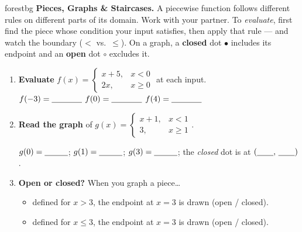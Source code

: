 \documentclass[10pt]{article}
\newcommand{\lgrid}[4]{%
  \draw[step=1, linegray!40, very thin] (#1,#3) grid (#2,#4);
  \draw[->, semithick, charcoal] (#1,0)--(#2,0) node[below right, font=\scriptsize]{$x$};
  \draw[->, semithick, charcoal] (0,#3)--(0,#4) node[left, font=\scriptsize]{$y$};}
\newcommand{\closeddot}[2]{\fill[forest] (#1,#2) circle (3.5pt);}
\newcommand{\opendot}[2]{\draw[very thick, forest, fill=white] (#1,#2) circle (3.5pt);}
\begin{document}

\vspace{0.08in}

\begin{headlinebox}{forestbg}
\small\textbf{Pieces, Graphs \& Staircases.} A piecewise function follows different rules on different
parts of its domain. Work with your partner. To \emph{evaluate}, first find the piece whose condition
your input satisfies, then apply that rule --- and watch the boundary ($<$ vs.\ $\le$). On a graph, a
\textbf{closed} dot $\bullet$ includes its endpoint and an \textbf{open} dot $\circ$ excludes it.
\end{headlinebox}

\vspace{0.06in}

\begin{tcolorbox}[colback=white, colframe=black!40, title=\textbf{Tier R --- Remediate},
    fonttitle=\bfseries, arc=1.5mm, left=3mm, right=3mm, top=2mm, bottom=2mm, breakable]
\begin{enumerate}[leftmargin=1.7em, itemsep=9pt]
  \item \textbf{Evaluate} $f(x)=\begin{cases} x+5, & x<0 \\ 2x, & x\ge 0 \end{cases}$ \quad at each input.
        \\[3pt]
        $f(-3)=\blank{1.3cm}$ \qquad $f(0)=\blank{1.3cm}$ \qquad $f(4)=\blank{1.3cm}$
  \item \textbf{Read the graph} of $g(x)=\begin{cases} x+1, & x<1 \\ 3, & x\ge 1 \end{cases}$.
        \begin{center}
        \end{center}
        $g(0)=\blank{1.0cm}$; \quad $g(1)=\blank{1.0cm}$; \quad $g(3)=\blank{1.0cm}$; \quad
        the \emph{closed} dot is at $(\blank{0.7cm},\,\blank{0.7cm})$.
  \item \textbf{Open or closed?} When you graph a piece\ldots
        \begin{itemize}[leftmargin=1.5em, itemsep=2pt]
          \item defined for $x>3$, the endpoint at $x=3$ is drawn \blank{2.2cm} (open / closed).
          \item defined for $x\le 3$, the endpoint at $x=3$ is drawn \blank{2.2cm} (open / closed).
        \end{itemize}
\end{enumerate}
\end{tcolorbox}
\end{document}
